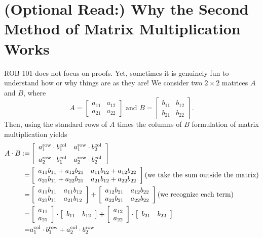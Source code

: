 \section{(Optional Read:) Why the Second Method of Matrix Multiplication Works}

ROB 101 does not focus on proofs. Yet, sometimes it is genuinely fun to understand how or why things are as they are! We consider two $2 \times 2$ matrices $A$ and $B$, where
$$A= \left[\begin{array}{cc} a_{11}& a_{12} \\ a_{21} & a_{22}\end{array}\right]
\text{ and } B= \left[\begin{array}{cc} b_{11}& b_{12} \\ b_{21} & b_{22}\end{array}\right]
.$$
Then, using the standard rows of $A$ times the columns of $B$ formulation of matrix multiplication yields
$$
\begin{aligned}
 A \cdot B := &
\left[\begin{array}{cc}  a_1^{\rm row} \cdot b_1^{\rm col} & a_1^{\rm row} \cdot b_2^{\rm col}  \medskip  \\
a_2^{\rm row} \cdot b_1^{\rm col} & a_2^{\rm row} \cdot b_2^{\rm col}
\end{array}\right] \\ 
=& \left[\begin{array}{cc}  a_{11} b_{11} + a_{12}b_{21} & a_{11} b_{12} + a_{12}b_{22} \\
a_{21} b_{11} + a_{22}b_{21} & a_{21} b_{12} + a_{22}b_{22}
\end{array}\right]\bigskip  \text{(we take the sum outside the matrix)}\\
=& \left[\begin{array}{cc}  a_{11} b_{11}  & a_{11} b_{12} \\
a_{21} b_{11}  & a_{21} b_{12} 
\end{array}\right] + \left[\begin{array}{cc}  a_{12} b_{21}  & a_{12} b_{22} \\
a_{22} b_{21}  & a_{22} b_{22} 
\end{array}\right] \bigskip  \text{(we recognize each term)}\\
=& \left[\begin{array}{c} a_{11}\\ a_{21} \end{array}\right] \cdot 
 \left[\begin{array}{cc} b_{11}& b_{12} \end{array}\right] + 
 \left[\begin{array}{c} a_{12}\\ a_{22} \end{array}\right] \cdot 
 \left[\begin{array}{cc} b_{21}& b_{22} \end{array}\right]\\
=& a^{\rm col}_1 \cdot b^{\rm row}_1 + a^{\rm col}_2 \cdot b^{\rm row}_2
\end{aligned}
$$

